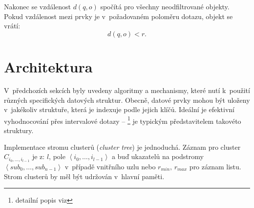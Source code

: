 Nakonec se vzdálenost $d(q,o)$ spočítá pro všechny neodfiltrované objekty. Pokud vzdálenost mezi prvky je v~požadovaném poloměru dotazu, objekt se vrátí:
\[
d(q,o) < r.
\]
\section{Architektura }

V~předchozích sekcích byly uvedeny algoritmy a mechanismy, které
nutí k~použití různých specifických datových struktur\@. Obecně,
datové prvky mohou být uloženy v~jakékoliv struktuře, která je indexuje
podle jejich \MIndex{} klíčů. Ideální je efektivní vyhodnocování přes
intervalové dotazy -- \BPTree{}\cite{Cormen:2001:IA:580470}%
\footnote{detailní popis \BPTree{} viz 
} je typickým představitelem takovéto struktury\@.

Implementace stromu clusterů (\emph{cluster tree}) je jednoduchá\@.
Záznam pro cluster $C_{i_{0},\ldots,i_{l-1}}$ je z: $l$, pole $\left\langle i_{0},\ldots,i_{l-1}\right\rangle $
a buď ukazatelů na podstromy $\left\langle sub_{0},\ldots,sub_{n-1}\right\rangle $
v~případě vnitřního uzlu nebo $r_{min},\, r_{max}$ pro záznam listu\@.
Strom clusterů by měl být udržován v~hlavní paměti.

